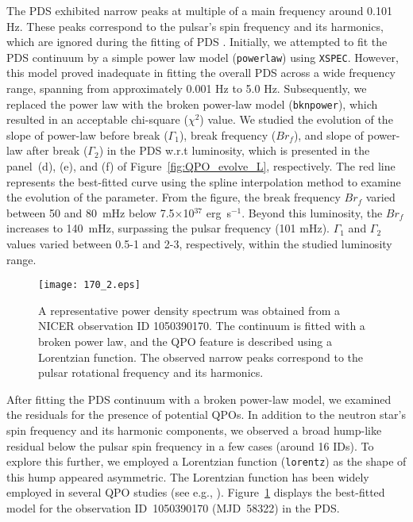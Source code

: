 \documentclass[twocolumn,trackchanges]{aastex631}
\begin{document}
The PDS exhibited narrow peaks at multiple of a main frequency around 0.101 Hz. These peaks correspond to the pulsar's spin frequency and its harmonics, which are ignored during the fitting of PDS \citep{2010MNRAS.407..285J}. Initially, we attempted to fit the PDS continuum by a simple power law model (\texttt{powerlaw}) using \texttt{XSPEC}. However, this model proved inadequate in fitting the overall PDS across a wide frequency range, spanning from approximately 0.001 Hz to 5.0 Hz. Subsequently, we replaced the power law with the broken power-law model (\texttt{bknpower}), which resulted in an acceptable chi-square ($\chi^2$) value. We studied the evolution of the slope of power-law before break ($\Gamma_{1}$), break frequency ($Br_f$),  and slope of power-law after break ($\Gamma_{2}$) in the PDS w.r.t luminosity, which is presented in the panel~(d), (e), and (f) of Figure~\ref{fig:QPO_evolve_L}, respectively. The red line represents the best-fitted curve using the spline interpolation method to examine the evolution of the parameter.  From the figure, the break frequency $Br_f$ varied  between 50 and 80~mHz below 7.5$\times$10$^{37}$ erg~s$^{-1}$. Beyond this luminosity, the  $Br_f$ increases to 140~mHz, surpassing the pulsar frequency (101 mHz). $\Gamma_{1}$ and $\Gamma_{2}$ values varied between 0.5-1 and 2-3, respectively, within the studied luminosity range.



\begin{figure}
    \texttt{[image: 170\_2.eps]}
    \caption{  
A representative power density spectrum was obtained from a NICER observation ID 1050390170. The continuum is fitted with a broken power law, and the QPO feature is described using a Lorentzian function.  The observed narrow peaks correspond to the pulsar rotational frequency and its harmonics.}
    \label{fig:QPO_detection}
\end{figure}


After fitting the PDS continuum with a broken power-law model, we examined the residuals for the presence of potential QPOs.  In addition to the neutron star's spin frequency and its harmonic components, we observed a broad hump-like residual below the pulsar spin frequency in a few cases (around 16 IDs). To explore this further, we employed a Lorentzian function (\texttt{lorentz}) as the shape of this hump appeared asymmetric. The Lorentzian function has been widely employed in several QPO studies (see e.g., \citealt{2002ApJ...572..392B}). Figure~\ref{fig:QPO_detection} displays the best-fitted model for the observation ID~1050390170 (MJD~58322) in the PDS.
\end{document}
